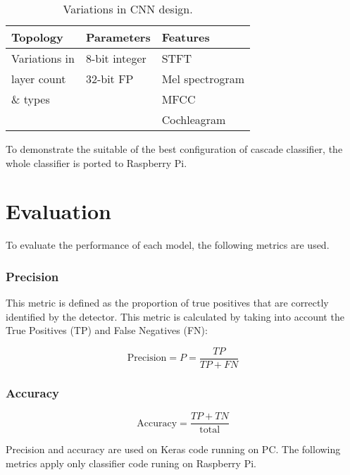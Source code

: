 \begin{table}[h]
    \caption{Variations in CNN design.}
    \label{variations}
    \centering\small
    \begin{tabular}{lll}
        \toprule
        \textbf{Topology} & \textbf{Parameters} & \textbf{Features} \\
        \midrule
        Variations in   & 8-bit integer & STFT \\
        layer count     & 32-bit FP     & Mel spectrogram \\
        \& types        &               & MFCC \\
                        &               & Cochleagram \\
        \bottomrule
    \end{tabular}
\end{table}


To demonstrate the suitable of the best configuration of cascade classifier, the whole classifier is ported to Raspberry Pi. 

\section{Evaluation}

To evaluate the performance of each model, the following metrics are used.

\subsubsection{Precision}

This metric is defined as the proportion of true positives that are correctly identified by the detector. 
This metric is calculated by taking into account the True Positives (TP) and False Negatives (FN):

\[
\mathrm{Precision} = P = \frac{TP}{TP + FN}
\]

\subsubsection{Accuracy}

\[
\mathrm{Accuracy} = \frac{TP+TN}{\mathrm{total}}
\]

\noindent
Precision and accuracy are used on Keras code running on PC. The following metrics apply only classifier code runing on Raspberry Pi.

